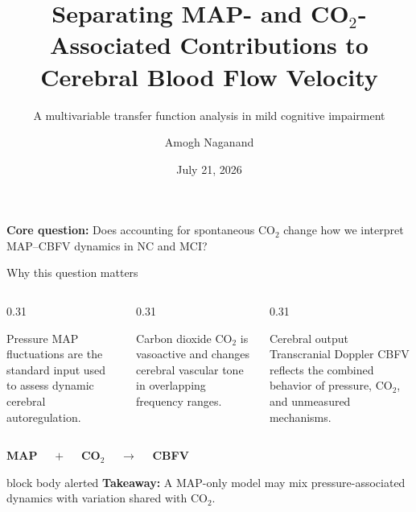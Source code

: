 \documentclass[aspectratio=169,11pt]{beamer}
\title{Separating MAP- and CO$_2$-Associated Contributions to Cerebral Blood
Flow Velocity}
\subtitle{A multivariable transfer function analysis in mild cognitive impairment}
\author{Amogh Naganand}
\date{July 21, 2026}
\newcommand{\takeaway}[1]{%
    \begin{beamercolorbox}[rounded=true,sep=0.12cm,wd=\linewidth]{block body alerted}
        \centering\textbf{Takeaway:} #1
    \end{beamercolorbox}}
\begin{document}

\begin{frame}[plain]
    \titlepage

    \vspace{-0.3cm}
    \begin{center}
        \color{ProjectNavy}
        \textbf{Core question:} Does accounting for spontaneous CO$_2$
        change how we interpret MAP--CBFV dynamics in NC and MCI?
    \end{center}
\end{frame}

\begin{frame}{Why this question matters}
    \begin{columns}[T,onlytextwidth]
        \begin{column}{0.31\textwidth}
            \begin{block}{Pressure}
                MAP fluctuations are the standard input used to assess
                dynamic cerebral autoregulation.
            \end{block}
        \end{column}
        \begin{column}{0.31\textwidth}
            \begin{alertblock}{Carbon dioxide}
                CO$_2$ is vasoactive and changes cerebral vascular tone in
                overlapping frequency ranges.
            \end{alertblock}
        \end{column}
        \begin{column}{0.31\textwidth}
            \begin{block}{Cerebral output}
                Transcranial Doppler CBFV reflects the combined behavior of
                pressure, CO$_2$, and unmeasured mechanisms.
            \end{block}
        \end{column}
    \end{columns}

    \vspace{0.35cm}
    \begin{center}
        \Large
        \color{ProjectBlue}\textbf{MAP}
        \color{black}$\quad+\quad$
        \color{ProjectOrange}\textbf{CO$_2$}
        \color{black}$\quad\longrightarrow\quad$
        \color{ProjectNavy}\textbf{CBFV}
    \end{center}

    \vspace{0.25cm}
    \takeaway{A MAP-only model may mix pressure-associated dynamics with
    variation shared with CO$_2$.}
\end{frame}
\end{document}
